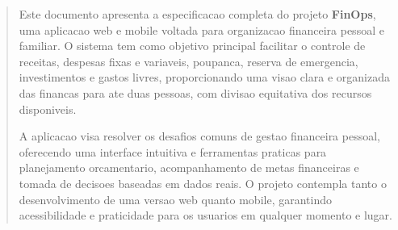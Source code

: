 \begin{abstract}
Este documento apresenta a especificacao completa do projeto \textbf{FinOps}, uma aplicacao web e mobile voltada para organizacao financeira pessoal e familiar. O sistema tem como objetivo principal facilitar o controle de receitas, despesas fixas e variaveis, poupanca, reserva de emergencia, investimentos e gastos livres, proporcionando uma visao clara e organizada das financas para ate duas pessoas, com divisao equitativa dos recursos disponiveis.

A aplicacao visa resolver os desafios comuns de gestao financeira pessoal, oferecendo uma interface intuitiva e ferramentas praticas para planejamento orcamentario, acompanhamento de metas financeiras e tomada de decisoes baseadas em dados reais. O projeto contempla tanto o desenvolvimento de uma versao web quanto mobile, garantindo acessibilidade e praticidade para os usuarios em qualquer momento e lugar.
\end{abstract}

